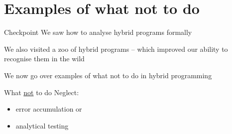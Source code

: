 \documentclass{beamer}
\begin{document}
\section{Examples of what not to do}

\begin{frame}{Checkpoint}
        We saw how to \alert{analyse} hybrid programs \alert{formally}

        We also visited a zoo of hybrid programs -- which improved our 
        ability to recognise them in the wild

        \pause
        We now go over examples of what \alert{not} to do in hybrid
        programming
\end{frame}

\begin{frame}{What \underline{not} to do}
        Neglect:
        \begin{itemize}
                \item error accumulation or
                \item analytical testing
        \end{itemize}
\end{frame}
\end{document}

